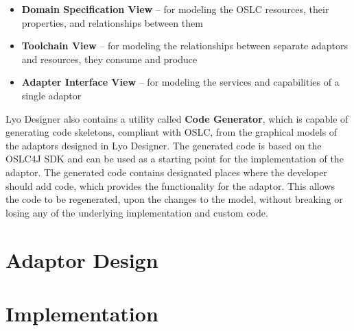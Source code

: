 \begin{itemize}
  \item \textbf{Domain Specification View} -- for modeling the OSLC resources, their properties, and relationships between them
  \item \textbf{Toolchain View} -- for modeling the relationships between separate adaptors and resources, they consume and produce
  \item \textbf{Adapter Interface View} -- for modeling the services and capabilities of a single adaptor
\end{itemize}

Lyo Designer also contains a utility called \textbf{Code Generator}, which is capable of generating code skeletons, compliant with OSLC, from the graphical models of the adaptors designed in Lyo Designer. The generated code is based on the OSLC4J SDK and can be used as a starting point for the implementation of the adaptor. The generated code contains designated places where the developer should add code, which provides the functionality for the adaptor. This allows the code to be regenerated, upon the changes to the model, without breaking or losing any of the underlying implementation and custom code.


\chapter{Adaptor Design}



\chapter{Implementation}



